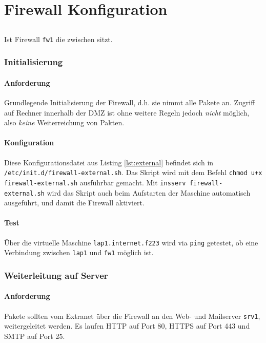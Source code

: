 \section{Firewall Konfiguration}

\subsection{\fwa}

Ist Firewall {\tt fw1} die zwischen \fwa sitzt.


\subsubsection{Initialisierung}

\paragraph{Anforderung} Grundlegende Initialisierung der Firewall, d.h.
sie nimmt alle Pakete an. Zugriff auf Rechner innerhalb der DMZ ist ohne
weitere Regeln jedoch \emph{nicht} möglich, also \emph{keine} Weiterreichung von
Pakten.

\paragraph{Konfiguration} Diese Konfigurationsdatei aus Listing \ref{lst:external}
befindet sich in {\tt /etc/init.d/firewall-external.sh}.
Das Skript wird mit dem Befehl {\tt chmod u+x firewall-external.sh}
ausführbar gemacht. Mit {\tt insserv firewall-external.sh}
wird das Skript auch beim Aufstarten der Maschine automatisch ausgeführt,
und damit die Firewall aktiviert.



\paragraph{Test} Über die virtuelle Maschine {\tt lap1.internet.f223} wird
via {\tt ping} getestet, ob eine Verbindung zwischen {\tt lap1} und {\tt fw1}
möglich ist.


\subsubsection{Weiterleitung auf Server}

\paragraph{Anforderung} Pakete sollten vom Extranet über die Firewall an
den Web- und Mailserver {\tt srv1}, weitergeleitet werden.
Es laufen HTTP auf Port 80, HTTPS auf Port 443 und SMTP auf Port 25.

